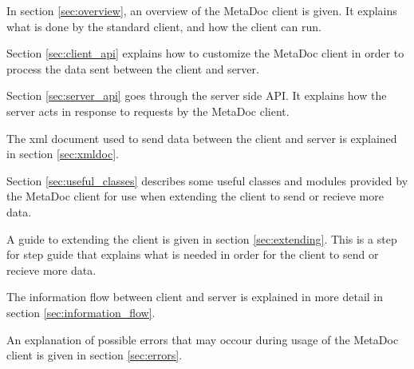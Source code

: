 In section \ref{sec:overview}, an overview of the MetaDoc client is given. It
explains what is done by the standard client, and how the client can run. 

Section \ref{sec:client_api} explains how to customize the MetaDoc client in
order to process the data sent between the client and server. 

Section \ref{sec:server_api} goes through the server side API. It explains how
the server acts in response to requests by the MetaDoc client. 

The \gls{xml} document used to send data between the client and server is
explained in section \ref{sec:xmldoc}. 

Section \ref{sec:useful_classes} describes some useful classes and modules
provided by the MetaDoc client for use when extending the client to send or
recieve more data. 

A guide to extending the client is given in section \ref{sec:extending}. This
is a step for step guide that explains what is needed in order for the client
to send or recieve more data. 

The information flow between client and server is explained in more detail in
section \ref{sec:information_flow}.

An explanation of possible errors that may occour during usage of the MetaDoc
client is given in section \ref{sec:errors}. 

